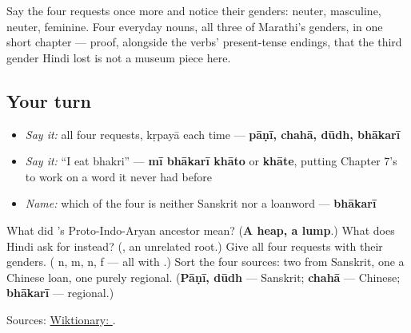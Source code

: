 \begin{culture}
Say the four requests once more and notice their genders: \textbf{} neuter, \textbf{} masculine, \textbf{} neuter, \textbf{} feminine. Four everyday nouns, all three of Marathi's genders, in one short chapter — proof, alongside the verbs' present-tense endings, that the third gender Hindi lost is not a museum piece here.
\end{culture}

\subsection*{Your turn}
\begin{itemize}
\raggedright
  \item \emph{Say it:} all four requests, kṛpayā each time — \textbf{pāṇī, chahā, dūdh, bhākarī}
  \item \emph{Say it:} \textquotedblleft{}I eat bhakri\textquotedblright{} — \textbf{mī bhākarī khāto} or \textbf{khāte}, putting Chapter 7's \textbf{} to work on a word it never had before
  \item \emph{Name:} which of the four is neither Sanskrit nor a loanword — \textbf{bhākarī}
\end{itemize}

\begin{tcolorbox}[breakable,colback=teal!4,colframe=teal!35!black,title={Before you move on}]
What did \textbf{}'s Proto-Indo-Aryan ancestor mean? (\textbf{A heap, a lump}.) What does Hindi ask for instead? (\textbf{}, an unrelated root.) Give all four requests with their genders. (\textbf{} n, \textbf{} m, \textbf{} n, \textbf{} f — all with \textbf{}.) Sort the four sources: two from Sanskrit, one a Chinese loan, one purely regional. (\textbf{Pāṇī, dūdh} — Sanskrit; \textbf{chahā} — Chinese; \textbf{bhākarī} — regional.)

Sources: \href{https://en.wiktionary.org/wiki/\%E0\%A4\%AD\%E0\%A4\%BE\%E0\%A4\%95\%E0\%A4\%B0\%E0\%A5\%80}{Wiktionary: }.
\end{tcolorbox}
